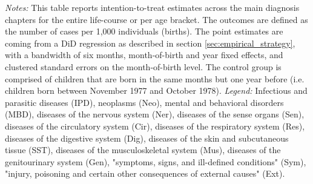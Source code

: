 \documentclass[11pt, a4paper]{article} %
\begin{document}
\begin{table}[H]
\begin{threeparttable}
{\begin{tabular}{l*{5}{c}}
				\bottomrule 
		\end{tabular}}
	\end{threeparttable} 
	\begin{minipage}{0.95\linewidth}
		\scriptsize \emph{Notes:} This table reports intention-to-treat estimates across the main diagnosis chapters for the entire life-course or per age bracket. The outcomes are defined as the number of cases per 1,000 individuals (births). The point estimates are coming from a DiD regression as described in section \ref{sec:empirical_strategy}, with a bandwidth of six months, month-of-birth and year fixed effects, and clustered standard errors on the month-of-birth level. The control group is comprised of children that are born in the same months but one year before (i.e. children born between November 1977 and October 1978).\newline
		\emph{Legend:} Infectious and parasitic diseases (IPD), neoplasms (Neo), mental and behavioral disorders (MBD), diseases of the nervous system (Ner), diseases of the sense organs (Sen), diseases of the circulatory system (Cir), diseases of the respiratory system (Res), diseases of the digestive system (Dig), diseases of the skin and subcutaneous tissue (SST), diseases of the musculoskeletal system (Mus), diseases of the genitourinary system (Gen), "symptoms, signs, and ill-defined conditions" (Sym), "injury, poisoning and certain other consequences of external causes" (Ext).
	\end{minipage}
\end{table} 
\vspace*{\fill}\clearpage 
\restoregeometry



\end{document}
